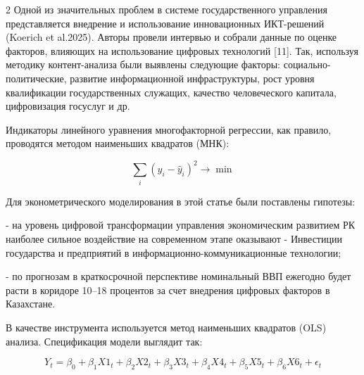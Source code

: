 \begin{multicols}{2}
Одной из значительных проблем в системе государственного управления
представляется внедрение и использование инновационных ИКТ-решений
(Koerich et al.2025). Авторы провели интервью и собрали данные по
оценке факторов, влияющих на использование цифровых технологий {[}11{]}.
Так, используя методику контент-анализа были выявлены следующие факторы:
социально-политические, развитие информационной инфраструктуры, рост
уровня квалификации государственных служащих, качество человеческого
капитала, цифровизация госуслуг и др.

Индикаторы линейного уравнения многофакторной регрессии, как правило,
проводятся методом наименьших квадратов (МНК):

\begin{equation}
\sum_{i} (y_{i} - \hat{y}_{i})^{2} \to \min
\end{equation}

Для эконометрического моделирования в этой статье были поставлены
гипотезы:

- на уровень цифровой трансформации управления экономическим развитием
РК наиболее сильное воздействие на современном этапе оказывают -
Инвестиции государства и предприятий в информационно-коммуникационные
технологии;

- по прогнозам в краткосрочной перспективе номинальный ВВП ежегодно
будет расти в коридоре 10--18 процентов за счет внедрения цифровых
факторов в Казахстане.

В качестве инструмента используется метод наименьших квадратов (OLS)
анализа. Спецификация модели выглядит так:
\end{multicols}
\vspace{-0.5cm}
\begin{equation}
Y_{t} = \beta_{0} + \beta_{1}X1_{t} + \beta_{2}X2_{t} + \beta_{3}X3_{t} + \beta_{4}X4_{t} + \beta_{5}X5_{t} + \beta_{6}X6_{t} + \epsilon_{t}
\end{equation}


